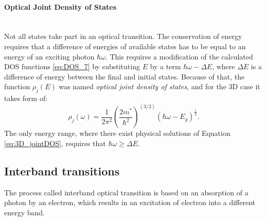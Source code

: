 \documentclass[titlepage,a4paper]{book}
\newcommand{\wciecie}{\quad\phantom{v}}
\newcommand{\myparagraph}[1]{\paragraph{#1}\mbox{}\\}
\begin{document}
\myparagraph{Optical Joint Density of States}
\wciecie
Not all states take part in an optical transition. The conservation of energy requires that a difference of energies of available states has to be equal to an energy of an exciting photon $\hbar\omega$. This requires a modification of the calculated DOS functions \ref{eq:DOS_7} by substituting $E$ by a term $\hbar\omega-\Delta E$, where $\Delta E$ is a difference of energy between the final and initial states. Because of that, the function $\rho_j (E)$ was named \textit{optical joint density of states}, and for the 3D case it takes form of:
\begin{equation}
\label{eq:3D_jointDOS}
\rho_j (\omega) = \frac{1}{2\pi^2} \left(\frac{2m^*}{\hbar^2} \right)^{(3/2)} (\hbar\omega-E_g)^{\frac{1}{2}}.
\end{equation}
The only energy range, where there exist physical solutions of Equation \ref{eq:3D_jointDOS}, requires that $\hbar\omega \geq \Delta E$.

\subsection{Interband transitions}
\wciecie
The process called interband optical transition is based on an absorption of a photon by an electron, which results in an excitation of electron into a different energy band. 
\end{document}
